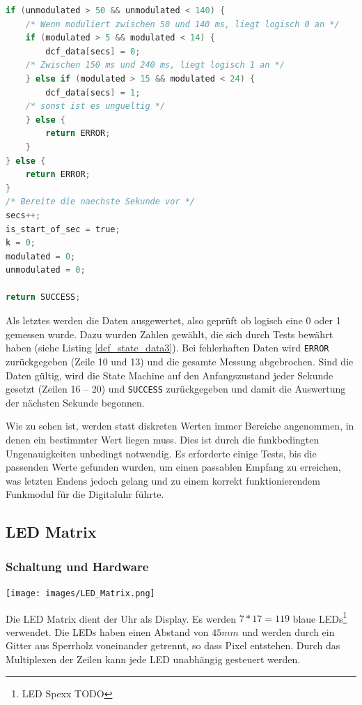 %
\begin{lstlisting}[language=C,label=dcf_state_data3,caption=Empfang des DCF77 Signals - Sekunde analysieren]
if (unmodulated > 50 && unmodulated < 140) {
    /* Wenn moduliert zwischen 50 und 140 ms, liegt logisch 0 an */
    if (modulated > 5 && modulated < 14) {
        dcf_data[secs] = 0;
    /* Zwischen 150 ms und 240 ms, liegt logisch 1 an */
    } else if (modulated > 15 && modulated < 24) {
        dcf_data[secs] = 1;
    /* sonst ist es ungueltig */
    } else {
        return ERROR;
    }
} else {
    return ERROR;
}
/* Bereite die naechste Sekunde vor */
secs++;
is_start_of_sec = true;
k = 0;
modulated = 0;
unmodulated = 0;

return SUCCESS;
\end{lstlisting}
%
Als letztes werden die Daten ausgewertet, also geprüft ob logisch eine 0 oder 1 gemessen wurde. Dazu wurden Zahlen gewählt, die sich durch Tests bewährt haben (siehe Listing \ref{dcf_state_data3}). Bei fehlerhaften Daten wird \texttt{ERROR} zurückgegeben (Zeile 10 und 13) und die gesamte Messung abgebrochen. Sind die Daten gültig, wird die State Machine auf den Anfangszustand jeder Sekunde gesetzt (Zeilen 16 -- 20) und \texttt{SUCCESS} zurückgegeben und damit die Auswertung der nächsten Sekunde begonnen.

Wie zu sehen ist, werden statt diskreten Werten immer Bereiche angenommen, in denen ein bestimmter Wert liegen muss. Dies ist durch die funkbedingten Ungenauigkeiten unbedingt notwendig. Es erforderte einige Tests, bis die passenden Werte gefunden wurden, um einen passablen Empfang zu erreichen, was letzten Endens jedoch gelang und zu einem korrekt funktionierendem Funkmodul für die Digitaluhr führte.
%
\subsection{LED Matrix}
\subsubsection{Schaltung und Hardware}
\begin{center}
	\texttt{[image: images/LED\_Matrix.png]}
\label{led_oben}
\end{center}
Die LED Matrix dient der Uhr als Display. Es werden $7*17=119$ blaue
LEDs\footnote{LED Spexx TODO} verwendet. Die LEDs haben einen Abstand von $45 mm$ und werden durch ein Gitter aus Sperrholz voneinander getrennt, so dass
Pixel entstehen. Durch das Multiplexen der Zeilen kann jede LED unabhängig
gesteuert werden.

